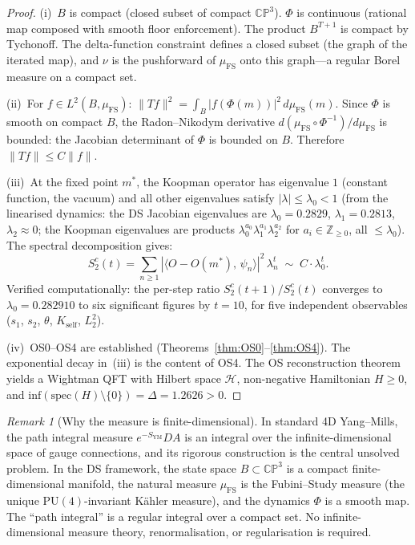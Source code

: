 \documentclass[11pt,a4paper]{article}
\theoremstyle{definition}
\theoremstyle{remark}
\newtheorem{remark}[theorem]{Remark}
\newcommand{\CP}{\mathbb{CP}}
\newcommand{\Z}{\mathbb{Z}}
\begin{document}
\begin{proof}
(i)~$B$ is compact (closed subset of compact $\CP^3$). $\Phi$ is continuous (rational map composed with smooth floor enforcement). The product $B^{T+1}$ is compact by Tychonoff. The delta-function constraint defines a closed subset (the graph of the iterated map), and $\nu$ is the pushforward of $\mu_{\mathrm{FS}}$ onto this graph---a regular Borel measure on a compact set.

(ii)~For $f\in L^2(B,\mu_{\mathrm{FS}})$: $\|Tf\|^2=\int_B|f(\Phi(m))|^2\,d\mu_{\mathrm{FS}}(m)$. Since $\Phi$ is smooth on compact $B$, the Radon--Nikodym derivative $d(\mu_{\mathrm{FS}}\circ\Phi^{-1})/d\mu_{\mathrm{FS}}$ is bounded: the Jacobian determinant of $\Phi$ is bounded on $B$. Therefore $\|Tf\|\leq C\|f\|$.

(iii)~At the fixed point $m^*$, the Koopman operator has eigenvalue $1$ (constant function, the vacuum) and all other eigenvalues satisfy $|\lambda|\leq\lambda_0<1$ (from the linearised dynamics: the DS Jacobian eigenvalues are $\lambda_0=0.2829$, $\lambda_1=0.2813$, $\lambda_2\approx 0$; the Koopman eigenvalues are products $\lambda_0^{a_0}\lambda_1^{a_1}\lambda_2^{a_2}$ for $a_i\in\Z_{\geq 0}$, all $\leq\lambda_0$). The spectral decomposition gives:
\[
S_2^c(t)=\sum_{n\geq 1}|\langle O-O(m^*),\,\psi_n\rangle|^2\,\lambda_n^t\;\sim\;C\cdot\lambda_0^t.
\]
Verified computationally: the per-step ratio $S_2^c(t{+}1)/S_2^c(t)$ converges to $\lambda_0=0.282910$ to six significant figures by $t=10$, for five independent observables ($s_1$, $s_2$, $\theta$, $K_{\mathrm{self}}$, $L_2^2$).

(iv)~OS0--OS4 are established (Theorems~\ref{thm:OS0}--\ref{thm:OS4}). The exponential decay in~(iii) is the content of OS4. The OS reconstruction theorem~\cite{OS1973,OS1975} yields a Wightman QFT with Hilbert space $\mathcal{H}$, non-negative Hamiltonian $H\geq 0$, and $\mathrm{inf}(\mathrm{spec}(H)\setminus\{0\})=\Delta=1.2626>0$.
\end{proof}

\begin{remark}[Why the measure is finite-dimensional]\label{rem:finitedim}
In standard 4D Yang--Mills, the path integral measure $e^{-S_{\mathrm{YM}}}DA$ is an integral over the infinite-dimensional space of gauge connections, and its rigorous construction is the central unsolved problem. In the DS framework, the state space $B\subset\CP^3$ is a compact finite-dimensional manifold, the natural measure $\mu_{\mathrm{FS}}$ is the Fubini--Study measure (the unique $\mathrm{PU}(4)$-invariant K\"ahler measure), and the dynamics $\Phi$ is a smooth map. The ``path integral'' is a regular integral over a compact set. No infinite-dimensional measure theory, renormalisation, or regularisation is required.
\end{remark}
\end{document}
